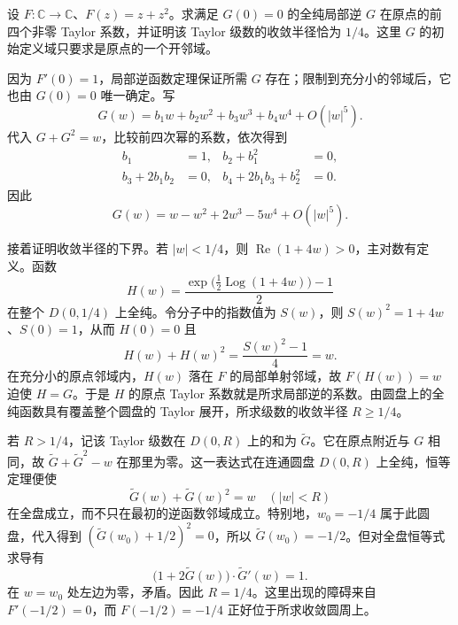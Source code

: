 \begin{optionalexercise}\label{b3:ex:01-inverse-radius}
设 \(F:\mathbb C\rightarrow\mathbb C\)、\(F(z)=z+z^2\)。求满足 \(G(0)=0\) 的全纯局部逆 \(G\) 在原点的前四个非零 Taylor 系数，并证明该 Taylor 级数的收敛半径恰为 \(1/4\)。这里 \(G\) 的初始定义域只要求是原点的一个开邻域。
\end{optionalexercise}
\begin{solution}
因为 \(F'(0)=1\)，局部逆函数定理保证所需 \(G\) 存在；限制到充分小的邻域后，它也由 \(G(0)=0\) 唯一确定。写
\[
  G(w)=b_1w+b_2w^2+b_3w^3+b_4w^4+O(|w|^5).
\]
代入 \(G+G^2=w\)，比较前四次幂的系数，依次得到
\[
\begin{aligned}
  b_1&=1,&b_2+b_1^2&=0,\\
  b_3+2b_1b_2&=0,&b_4+2b_1b_3+b_2^2&=0.
\end{aligned}
\]
因此
\[
  G(w)=w-w^2+2w^3-5w^4+O(|w|^5).
\]

接着证明收敛半径的下界。若 \(|w|<1/4\)，则
\(\operatorname{Re}(1+4w)>0\)，主对数有定义。函数
\[
  H(w)=\frac{\exp\bigl(\tfrac12\operatorname{Log}(1+4w)\bigr)-1}{2}
\]
在整个 \(D(0,1/4)\) 上全纯。令分子中的指数值为 \(S(w)\)，则
\(S(w)^2=1+4w\)、\(S(0)=1\)，从而 \(H(0)=0\) 且
\[
  H(w)+H(w)^2=\frac{S(w)^2-1}{4}=w.
\]
在充分小的原点邻域内，\(H(w)\) 落在 \(F\) 的局部单射邻域，故 \(F(H(w))=w\) 迫使 \(H=G\)。于是 \(H\) 的原点 Taylor 系数就是所求局部逆的系数。由圆盘上的全纯函数具有覆盖整个圆盘的 Taylor 展开，所求级数的收敛半径 \(R\ge1/4\)。

若 \(R>1/4\)，记该 Taylor 级数在 \(D(0,R)\) 上的和为 \(\widetilde G\)。它在原点附近与 \(G\) 相同，故
\(\widetilde G+\widetilde G^2-w\) 在那里为零。这一表达式在连通圆盘 \(D(0,R)\) 上全纯，恒等定理便使
\[
  \widetilde G(w)+\widetilde G(w)^2=w
  \quad(|w|<R)
\]
在全盘成立，而不只在最初的逆函数邻域成立。特别地，\(w_0=-1/4\) 属于此圆盘，代入得到
\((\widetilde G(w_0)+1/2)^2=0\)，所以 \(\widetilde G(w_0)=-1/2\)。但对全盘恒等式求导有
\[
  \bigl(1+2\widetilde G(w)\bigr)\cdot\widetilde G'(w)=1.
\]
在 \(w=w_0\) 处左边为零，矛盾。因此 \(R=1/4\)。这里出现的障碍来自 \(F'(-1/2)=0\)，而 \(F(-1/2)=-1/4\) 正好位于所求收敛圆周上。
\end{solution}

